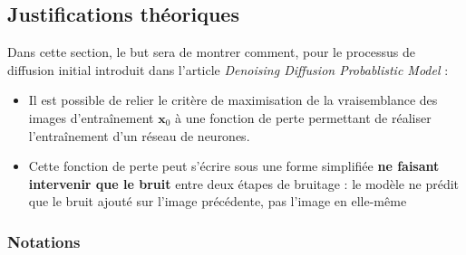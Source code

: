 \documentclass{article}
\begin{document}
\subsection{Justifications théoriques}

Dans cette section, le but sera de montrer comment, pour le processus de diffusion initial introduit dans l'article \textit{Denoising Diffusion Probablistic Model}\cite{DIFF20} :
\begin{itemize}
    \item Il est possible de relier le critère de maximisation de la vraisemblance des images d'entraînement $\boldsymbol{x}_0$ à une fonction de perte permettant de réaliser l'entraînement d'un réseau de neurones.
    \item Cette fonction de perte peut s'écrire sous une forme simplifiée \textbf{ne faisant intervenir que le bruit} entre deux étapes de bruitage : le modèle ne prédit que le bruit ajouté sur l'image précédente, pas l'image en elle-même
\end{itemize}

\subsubsection{Notations}
\label{sec:DDPM_Notations}
\end{document}

